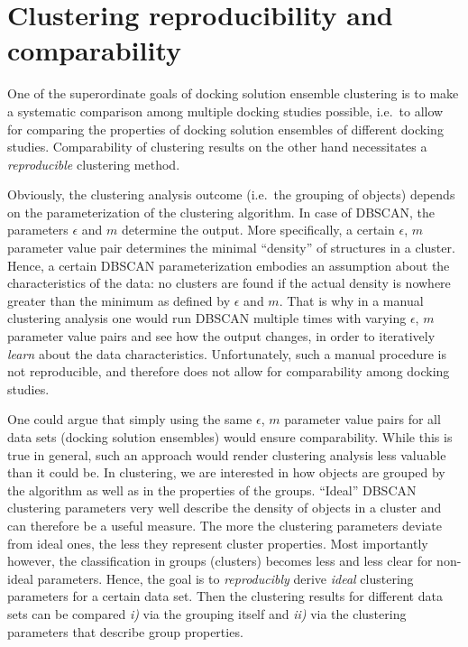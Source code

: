 \section{Clustering reproducibility and comparability}
\label{clustering_param_opt}

One of the superordinate goals of docking solution ensemble clustering is to
make a systematic comparison among multiple docking studies possible, i.e.\ to
allow for comparing the properties of docking solution ensembles of different
docking studies. Comparability of clustering results on the other hand
necessitates a \textit{reproducible} clustering method.

Obviously, the clustering analysis outcome (i.e.\ the grouping of objects)
depends on the parameterization of the clustering algorithm. In case of DBSCAN,
the parameters $\epsilon$ and $m$ determine the output. More specifically, a
certain $\epsilon$, $m$ parameter value pair determines the minimal
\enquote{density} of structures in a cluster. Hence, a certain DBSCAN
parameterization embodies an assumption about the characteristics of the data:
no clusters are found if the actual density is nowhere greater than the minimum
as defined by $\epsilon$ and $m$. That is why in a manual clustering analysis
one would run DBSCAN multiple times with varying $\epsilon$, $m$ parameter value
pairs and see how the output changes, in order to iteratively \textit{learn}
about the data characteristics. Unfortunately, such a manual procedure is not
reproducible, and therefore does not allow for comparability among docking
studies.

One could argue that simply using the same $\epsilon$, $m$ parameter value pairs
for all data sets (docking solution ensembles) would ensure comparability. While
this is true in general, such an approach would render clustering analysis less
valuable than it could be. In clustering, we are interested in how objects are
grouped by the algorithm as well as in the properties of the groups.
\enquote{Ideal} DBSCAN clustering parameters very well describe the density of
objects in a cluster and can therefore be a useful measure. The more the
clustering parameters deviate from ideal ones, the less they represent cluster
properties. Most importantly however, the classification in groups (clusters)
becomes less and less clear for non-ideal parameters. Hence, the goal is to
\textit{reproducibly} derive \textit{ideal} clustering parameters for a certain
data set. Then the clustering results for different data sets can be compared
\textit{i)} via the grouping itself and \textit{ii)} via the clustering
parameters that describe group properties.

